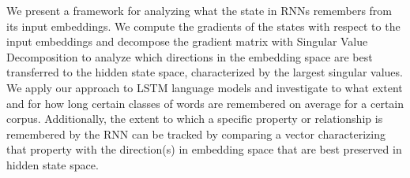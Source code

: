 We present a framework for analyzing what the state in RNNs remembers from its input embeddings. We compute the gradients of the states with respect to the input embeddings and decompose the gradient matrix with Singular Value Decomposition to analyze which directions in the embedding space are best transferred to the hidden state space, characterized by the largest singular values. We apply our approach to LSTM language models and investigate to what extent and for how long certain classes of words are remembered on average for a certain corpus. Additionally, the extent to which a specific property or relationship is remembered by the RNN can be tracked by comparing a vector characterizing that property with the direction(s) in embedding space that are best preserved in hidden state space.
